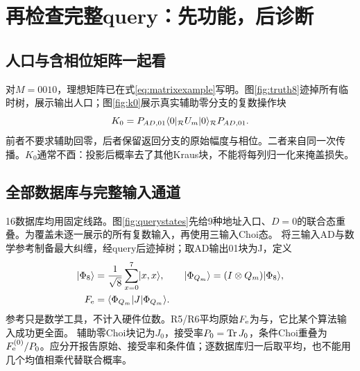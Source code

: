 \section{再检查完整query：先功能，后诊断}\label{sec:network}
\subsection{人口与含相位矩阵一起看}
对$M=0010$，理想矩阵已在式\eqref{eq:matrixexample}写明。图\ref{fig:truth8}迹掉所有临时树，展示输出人口；图\ref{fig:k0}展示真实辅助零分支的复数操作块
\begin{equation}\label{eq:K0}
 K_0=P_{AD,01}\langle 0\rvert_{\mathcal R}U_m\lvert 0\rangle_{\mathcal R}P_{AD,01}.
\end{equation}
前者不要求辅助回零，后者保留返回分支的原始幅度与相位。二者来自同一次传播。$K_0$通常不酉：投影后概率去了其他Kraus块，不能将每列归一化来掩盖损失。

\subsection{全部数据库与完整输入通道}
16数据库均用固定线路。图\ref{fig:querystates}先给9种地址入口、$D=0$的联合态重叠。为覆盖未逐一展示的所有复数输入，再使用三输入Choi态。
将三输入AD与数学参考制备最大纠缠，经query后迹掉树；取AD输出01块为J，定义
\begin{equation}\label{eq:Fe}
\begin{aligned}
 \lvert \Phi_8\rangle&=\frac1{\sqrt8}\sum_{x=0}^7\lvert x,x\rangle,\qquad
 \lvert \Phi_{Q_m}\rangle=(I\otimes Q_m)\lvert \Phi_8\rangle,\\
 F_{\mathrm e}&=\langle \Phi_{Q_m}\rvert J\lvert \Phi_{Q_m}\rangle.
\end{aligned}
\end{equation}
参考只是数学工具，不计入硬件位数。R5/R6平均原始$F_{\mathrm e}$为\RfiveFe{}与\RsixFe{}，它比某个算法输入成功更全面。
辅助零Choi块记为$J_0$，接受率$P_0=\operatorname{Tr} J_0$，条件Choi重叠为$F_{\mathrm e}^{(0)}/P_0$。应分开报告原始、接受率和条件值；逐数据库归一后取平均，也不能用几个均值相乘代替联合概率。

